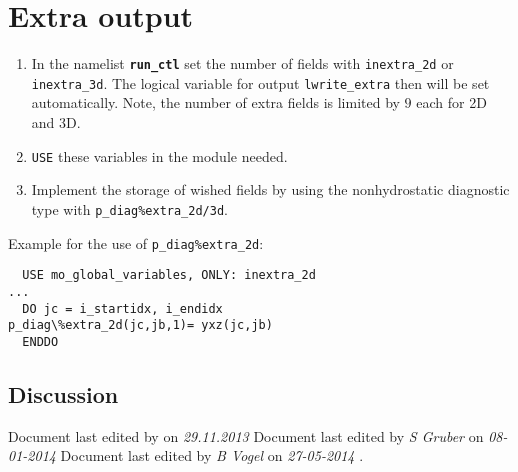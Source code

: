 \section{Extra output}


\begin{enumerate} 
\item In the namelist {\bf \texttt{run\_ctl}} set the number of fields with \texttt{inextra\_2d} or
  \texttt{inextra\_3d}. The logical variable for output
  \texttt{lwrite\_extra} then will be set automatically. Note, the
  number of extra fields is limited by $9$ each for 2D and 3D.
\item  \texttt{USE} these variables in the module needed.
\item Implement the storage of wished fields by using the
  nonhydrostatic diagnostic type with
  \texttt{p\_diag\%extra\_2d/3d}. 
\end{enumerate} 

Example for the use of  \texttt{p\_diag\%extra\_2d}:  

\begin{small}
\begin{verbatim}
  USE mo_global_variables, ONLY: inextra_2d
...
  DO jc = i_startidx, i_endidx
p_diag\%extra_2d(jc,jb,1)= yxz(jc,jb)
  ENDDO
\end{verbatim}
\end{small}



\newpage
\subsection*{Discussion}
Document last edited by \textit{\krauti} on \textit{29.11.2013}
Document last edited by \textit{S Gruber} on \textit{08-01-2014}
Document last edited by \textit{B Vogel} on \textit{27-05-2014}
.




